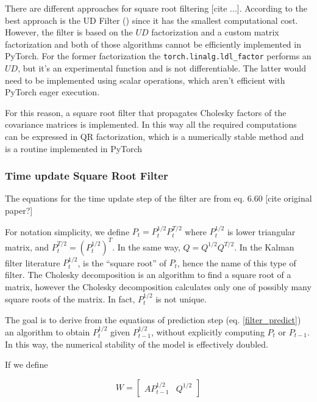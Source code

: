 \documentclass{article}
\let\Oldsubsubsection\subsubsection
\renewcommand{\subsubsection}{\FloatBarrier\Oldsubsubsection}
\begin{document}
There are different approaches for square root filtering [cite ...]. According to \cite{mohinder_s_grewal_kalman_2001} the best approach is the UD Filter (\cite{bierman_numerical_1977}) since it has the smallest computational cost. However, the filter is based on the $UD$ factorization and a custom matrix factorization \cite{mohinder_s_grewal_kalman_2001} and both of those algorithms cannot be efficiently implemented in PyTorch. For the former factorization the \verb|torch.linalg.ldl_factor| performs an $UD$, but it's an experimental function and is not differentiable. The latter would need to be implemented using scalar operations, which aren't efficient with PyTorch eager execution.

For this reason, a square root filter that propagates Cholesky factors of the covariance matrices is implemented. In this way all the required computations can be expressed in QR factorization, which is a numerically stable method and is a routine implemented in PyTorch

\subsubsection{Time update Square Root Filter}

The equations for the time update step of the filter are from \cite{mohinder_s_grewal_kalman_2001} eq. 6.60 [cite original paper?]

For notation simplicity, we define $P_t=P_t^{1/2}P_t^{T/2}$ where $P_t^{1/2}$ is lower triangular matrix, and $P_t^{T/2} = (P_t^{1/2})^T$. In the same way, $Q=Q^{1/2}Q^{T/2}$. In the Kalman filter literature $P_t^{1/2}$, is the ``square root'' of $P_t$, hence the name of this type of filter. The Cholesky decomposition is an algorithm to find a square root of a matrix, however the Cholesky decomposition calculates only one of possibly many square roots of the matrix. In fact, $P_t^{1/2}$ is not unique.

The goal is to derive from the equations of prediction step (eq. \ref{filter_predict}) an algorithm to obtain $P_t^{1/2}$ given $P_{t-1}^{1/2}$, without explicitly computing $P_t$ or $P_{t-1}$. In this way, the numerical stability of the model is effectively doubled.

If we define

\begin{equation}
    W = \begin{bmatrix}AP_{t-1}^{1/2} & Q^{1/2}\end{bmatrix}
\end{equation}
\end{document}
